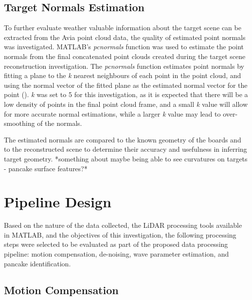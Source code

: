 \subsection{Target Normals Estimation}
\label{subsec:ch5.section2.subsec2}

To further evaluate weather valuable information about the target scene can be extracted from the Avia point cloud data, the quality of estimated point normals was investigated. MATLAB's \emph{pcnormals} function was used to estimate the point normals from the final concatenated point clouds created during the target scene reconstruction investigation. The \emph{pcnormals} function estimates point normals by fitting a plane to the \emph{k} nearest neighbours of each point in the point cloud, and using the normal vector of the fitted plane as the estimated normal vector for the point (\cite{PcnormalsEstimateNormals}). \emph{k} was set to 5 for this investigation, as it is expected that there will be a low density of points in the final point cloud frame, and a small \emph{k} value will allow for more accurate normal estimations, while a larger \emph{k} value may lead to over-smoothing of the normals.

The estimated normals are compared to the known geometry of the boards and to the reconstructed scene to determine their accuracy and usefulness in inferring target geometry. *something about maybe being able to see curvatures on targets - pancake surface features?*

\section{Pipeline Design}
\label{sec:ch5.section3}

Based on the nature of the data collected, the \ac{LiDAR} processing tools available in MATLAB, and the objectives of this investigation, the following processing steps were selected to be evaluated as part of the proposed data processing pipeline: motion compensation, de-noising, wave parameter estimation, and pancake identification. 

\subsection{Motion Compensation}
\label{subsec:ch5.section3.subsec1}

